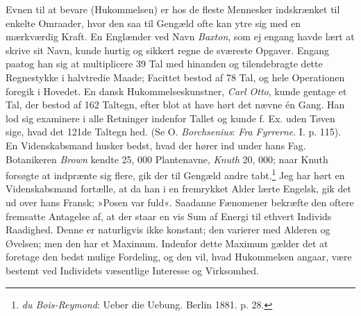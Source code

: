 \documentclass[12pt,a4paper,openany]{book}
\newcommand{\opage}[1]{\marginnote{\footnotesize\textit{[#1]}}}
\begin{document}
Evnen til at bevare (Hukommelsen) er hos de fleste Mennesker indskrænket
til enkelte Omraader, hvor den saa til Gengæld ofte kan ytre sig med en
mærkværdig Kraft. En Englænder ved Navn \emph{Baxton}, som ej engang
havde lært at skrive sit Navn, kunde hurtig og sikkert regne de sværeste
Opgaver. Engang paatog han sig at multiplicere 39 Tal med hinanden og
tilendebragte dette Regnestykke i halvtredie Maade; Facittet bestod af
78 Tal, og hele Operationen foregik i Hovedet. En dansk
Hukommelseskunstner, \emph{Carl Otto}, kunde gentage et Tal, der bestod
af 162 Taltegn, efter blot at have hørt det nævne én Gang. Han lod sig
examinere i alle Retninger indenfor Tallet og kunde f. Ex. uden Tøven
sige, hvad det 121de Taltegn hed. (Se O. \emph{Borchsenius}: \emph{Fra
Fyrrerne}. I. p. 115). En Videnskabsmand husker bedst, hvad der hører
ind under hans Fag. Botanikeren \emph{Brown} kendte 25, 000 Plantenavne,
\emph{Knuth} 20, 000; naar Knuth forsøgte at indprænte sig flere, gik
der til Gengæld andre tabt.\footnote[2]{\emph{du Bois-Reymond}: Ueber die
Uebung. Berlin 1881. p. 28.} Jeg har hørt en Videnskabsmand fortælle, at
da han i en fremrykket Alder lærte Engelsk, gik det ud over hans Fransk;
»Posen var fuld«.
\opage{185}Saadanne Fænomener bekræfte den oftere fremsatte Antagelse
af, at der staar en vis Sum af Energi til ethvert Individs Raadighed.
Denne er naturligvis ikke konstant; den varierer med Alderen og Øvelsen;
men den har et Maximum. Indenfor dette Maximum gælder det at foretage
den bedst mulige Fordeling, og den vil, hvad Hukommelsen angaar, være
bestemt ved Individets væsentlige Interesse og Virksomhed.
\end{document}
